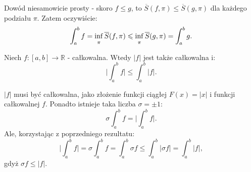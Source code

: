 \documentclass{article}
\numberwithin{defi}{section}
\numberwithin{defi}{section}
\newcommand{\R}{\mathbb{R}}
\renewcommand{\inf}{\mathop{\mathrm{inf}\vphantom{\mathrm{sup}}}}
\newcommand{\Sg}{\overline{S}}
\renewcommand{\leq}{\leqslant}
\begin{document}
\begin{dow}{}
    Dowód niesamowicie prosty - skoro $f \leq g$, to $\Sg(f, \pi) \leq \Sg(g, \pi)$ dla każdego podziału $\pi$. Zatem oczywiście: \begin{equation*}
        \int_{a}^{b} f = \inf_{\pi} \Sg(f, \pi) \leq \inf_{\pi} \Sg(g, \pi) = \int_{a}^{b} g.
    \end{equation*}
\end{dow}


\begin{twier}{}
    Niech $f: [a, b]  \to \R$ - całkowalna. Wtedy $|f|$ jest także całkowalna i: \begin{equation}
        \big| \int_{a}^{b} f \big| \leq \int_{a}^{b} \big| f \big|.
    \end{equation}
\end{twier}


\begin{dow}{}
    $|f|$ musi być całkowalna, jako złożenie funkcji ciągłej $F(x) = |x|$ i funkcji całkowalnej $f$. Ponadto istnieje taka liczba $\sigma = \pm 1$: \begin{equation*}
        \sigma \int_{a}^{b} f = \big| \int_{a}^{b} f \big|.
    \end{equation*} Ale, korzystając z poprzedniego rezultatu:\begin{equation*}
        \big| \int_{a}^{b} f \big| = \sigma \int_{a}^{b} f =  \int_{a}^{b} \sigma f \leq \int_{a}^{b} \big| \sigma f \big| = \int_{a}^{b} \big| f \big|,
    \end{equation*} gdyż $\sigma f \leq |f|$.
\end{dow}
\end{document}

